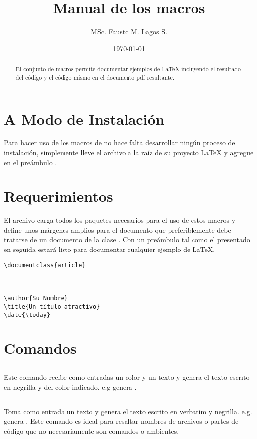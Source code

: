 \documentclass{article}
\author{MSc. Fausto M. Lagos S.}
\title{Manual de los macros \bftt{LaTeX2Code.tex}}
\date{\today}
\begin{document}
\maketitle

\begin{abstract}
	El conjunto de macros  permite documentar ejemplos de \LaTeX{} incluyendo el resultado del código y el código mismo en el documento pdf resultante. 
\end{abstract}
	
	\section{A Modo de Instalación}
		Para hacer uso de los macros de  no hace falta desarrollar ningún proceso de instalación, simplemente lleve el archivo  a la raíz de su proyecto \LaTeX{} y agregue en el preámbulo \texttt{}.
		
	\section{Requerimientos}
		El archivo  carga todos los paquetes necesarios para el uso de estos macros y define unos márgenes amplios para el documento que preferiblemente debe tratarse de un documento de la clase . Con un preámbulo tal como el presentado en seguida estará listo para documentar cualquier ejemplo de \LaTeX{}.
		\begin{verbatim}
\documentclass{article}



\author{Su Nombre}
\title{Un título atractivo}
\date{\today}
		\end{verbatim}
		
	\section{Comandos}
	
	\subsection{}
		Este comando recibe como entradas un color y un texto y genera el texto escrito en negrilla y del color indicado. e.g \texttt{} genera .
		
	\subsection{}
		Toma como entrada un texto y genera el texto escrito en verbatim y negrilla. e.g. \texttt{} genera . Este comando es ideal para resaltar nombres de archivos o partes de código que no necesariamente son comandos o ambientes.
\end{document}
